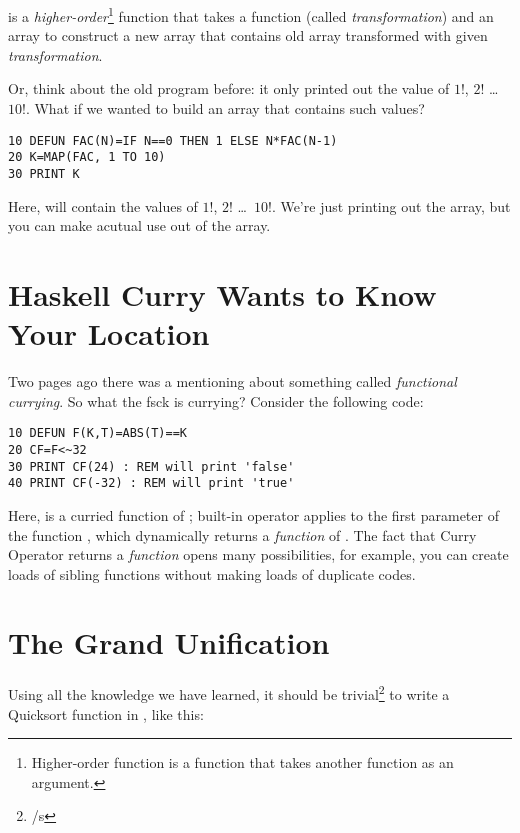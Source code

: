  is a \emph{higher-order}\footnote{Higher-order function is a function that takes another function as an argument.} function that takes a function (called \emph{transformation}) and an array to construct a new array that contains old array transformed with given \emph{transformation}.

Or, think about the old  program before: it only printed out the value of $1!$, $2!$ \ldots\ $10!$. What if we wanted to build an array that contains such values?

\begin{lstlisting}
10 DEFUN FAC(N)=IF N==0 THEN 1 ELSE N*FAC(N-1)
20 K=MAP(FAC, 1 TO 10)
30 PRINT K
\end{lstlisting}

Here,  will contain the values of $1!$, $2!$ \ldots\ $10!$. We're just printing out the array, but you can make acutual use out of the array.

\section[Currying]{Haskell Curry Wants to Know Your Location}
\label{currying101}

Two pages ago there was a mentioning about something called \emph{functional currying}. So what the fsck is currying? Consider the following code:

\begin{lstlisting}
10 DEFUN F(K,T)=ABS(T)==K
20 CF=F<~32
30 PRINT CF(24) : REM will print 'false'
40 PRINT CF(-32) : REM will print 'true'
\end{lstlisting}

Here,  is a curried function of ; built-in operator \code{$<\!\sim$} applies  to the first parameter of the function , which dynamically returns a \emph{function} of . The fact that Curry Operator returns a \emph{function} opens many possibilities, for example, you can create loads of sibling functions without making loads of duplicate codes.

\section[Wrapping-Up]{The Grand Unification}

Using all the knowledge we have learned, it should be trivial\footnote{/s} to write a Quicksort function in \tbas, like this:

